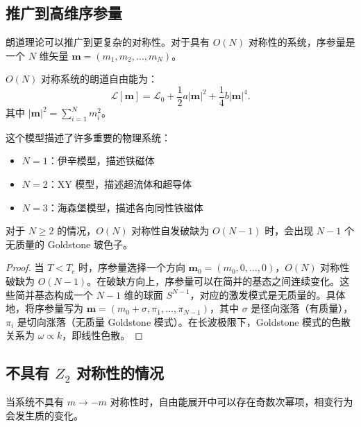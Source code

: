 \subsection{推广到高维序参量}

朗道理论可以推广到更复杂的对称性。对于具有 $O(N)$ 对称性的系统，序参量是一个 $N$ 维矢量 $\mathbf{m} = (m_1, m_2, \ldots, m_N)$。

\begin{definition}[$O(N)$ 朗道自由能]
$O(N)$ 对称系统的朗道自由能为：
\begin{equation}
    \mathcal{L}[\mathbf{m}] = \mathcal{L}_0 + \frac{1}{2}a |\mathbf{m}|^2 + \frac{1}{4}b |\mathbf{m}|^4.
\end{equation}
其中 $|\mathbf{m}|^2 = \sum_{i=1}^N m_i^2$。
\end{definition}

\begin{example}
这个模型描述了许多重要的物理系统：
\begin{itemize}
    \item $N = 1$：伊辛模型，描述铁磁体
    \item $N = 2$：XY 模型，描述超流体和超导体
    \item $N = 3$：海森堡模型，描述各向同性铁磁体
\end{itemize}
\end{example}

\begin{theorem}[Goldstone 定理]
对于 $N \geq 2$ 的情况，$O(N)$ 对称性自发破缺为 $O(N-1)$ 时，会出现 $N-1$ 个无质量的 Goldstone 玻色子。
\end{theorem}

\begin{proof}
当 $T < T_c$ 时，序参量选择一个方向 $\mathbf{m}_0 = (m_0, 0, \ldots, 0)$，$O(N)$ 对称性破缺为 $O(N-1)$。在破缺方向上，序参量可以在简并的基态之间连续变化。这些简并基态构成一个 $N-1$ 维的球面 $S^{N-1}$，对应的激发模式是无质量的。具体地，将序参量写为 $\mathbf{m} = (m_0 + \sigma, \pi_1, \ldots, \pi_{N-1})$，其中 $\sigma$ 是径向涨落（有质量），$\pi_i$ 是切向涨落（无质量 Goldstone 模式）。在长波极限下，Goldstone 模式的色散关系为 $\omega \propto k$，即线性色散。
\end{proof}

\subsection{不具有 $Z_2$ 对称性的情况}

\begin{note}
当系统不具有 $m \to -m$ 对称性时，自由能展开中可以存在奇数次幂项，相变行为会发生质的变化。
\end{note}

